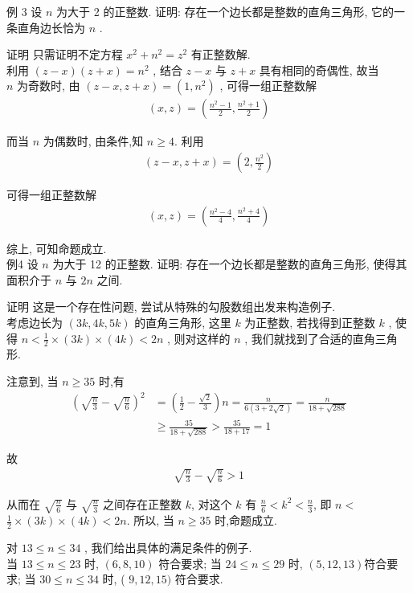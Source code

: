 	例 3 设 $n$ 为大于 2 的正整数. 证明: 存在一个边长都是整数的直角三角形, 它的一条直角边长恰为 $n$ .

	证明 只需证明不定方程 $x^{2}+n^{2}=z^{2}$ 有正整数解. \\
	利用 $(z-x)(z+x)=n^{2}$ , 结合 $z-x$ 与 $z+x$ 具有相同的奇偶性, 故当\\
$n$ 为奇数时, 由 $(z-x, z+x)=\left(1, n^{2}\right)$ , 可得一组正整数解
\begin{align*}
		(x, z)=\left(\frac{n^{2}-1}{2}, \frac{n^{2}+1}{2}\right)
	\end{align*}

	而当 $n$ 为偶数时, 由条件,知 $n \geqslant 4$. 利用
\begin{align*}
		(z-x, z+x)=\left(2, \frac{n^{2}}{2}\right)
	\end{align*}

	可得一组正整数解
\begin{align*}
		(x, z)=\left(\frac{n^{2}-4}{4}, \frac{n^{2}+4}{4}\right)
	\end{align*}

	综上, 可知命题成立. \\
	例4 设 $n$ 为大于 12 的正整数. 证明: 存在一个边长都是整数的直角三角形, 使得其面积介于 $n$ 与 $2 n$ 之间.

	证明 这是一个存在性问题, 尝试从特殊的勾股数组出发来构造例子. \\
	考虑边长为 $(3 k, 4 k, 5 k)$ 的直角三角形, 这里 $k$ 为正整数, 若找得到正整数 $k$ , 使得 $n<\frac{1}{2} \times(3 k) \times(4 k)<2 n$ , 则对这样的 $n$ , 我们就找到了合适的直角三角形.

	注意到, 当 $n \geqslant 35$ 时,有\begin{align}
		\left(\sqrt{\frac{n}{3}}-\sqrt{\frac{n}{6}}\right)^{2} & =\left(\frac{1}{2}-\frac{\sqrt{2}}{3}\right) n=\frac{n}{6(3+2 \sqrt{2})}=\frac{n}{18+\sqrt{288}} \\
		                                                       & \geqslant \frac{35}{18+\sqrt{288}}>\frac{35}{18+17}=1
	\end{align}

	故
\begin{align*}
		\sqrt{\frac{n}{3}}-\sqrt{\frac{n}{6}}>1
	\end{align*}

	从而在 $\sqrt{\frac{n}{6}}$ 与 $\sqrt{\frac{n}{3}}$ 之间存在正整数 $k$, 对这个 $k$ 有 $\frac{n}{6}<k^{2}<\frac{n}{3}$, 即 $n<$ $\frac{1}{2} \times(3 k) \times(4 k)<2 n$. 所以, 当 $n \geqslant 35$ 时,命题成立.

	对 $13 \leqslant n \leqslant 34$ , 我们给出具体的满足条件的例子. \\
	当 $13 \leqslant n \leqslant 23$ 时,  $(6,8,10)$ 符合要求; 当 $24 \leqslant n \leqslant 29$ 时,  $(5,12,13)$符合要求; 当 $30 \leqslant n \leqslant 34$ 时, ( $9,12,15)$ 符合要求.

